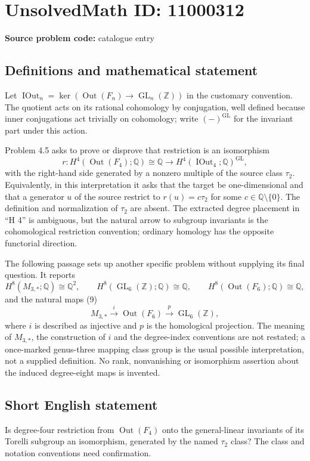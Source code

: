 \documentclass[11pt]{article}
\newcommand{\Z}{\mathbb{Z}}
\newcommand{\Q}{\mathbb{Q}}
\begin{document}
\section*{UnsolvedMath ID: 11000312}
\textbf{Source problem code:} catalogue entry
\subsection{Definitions and mathematical statement}
Let $\operatorname{IOut}_n=\ker(\operatorname{Out}(F_n)\to\operatorname{GL}_n(\Z))$ in the customary convention. The quotient acts on its rational cohomology by conjugation, well defined because inner conjugations act trivially on cohomology; write $(-)^{\operatorname{GL}}$ for the invariant part under this action.

Problem 4.5 asks to prove or disprove that restriction is an isomorphism
\[
 r:H^4(\operatorname{Out}(F_4);\Q)\cong\Q
 \longrightarrow
 H^4(\operatorname{IOut}_4;\Q)^{\operatorname{GL}},
\]
with the right-hand side generated by a nonzero multiple of the source class $\tau_2$. Equivalently, in this interpretation it asks that the target be one-dimensional and that a generator $u$ of the source restrict to $r(u)=c\tau_2$ for some $c\in\Q\setminus\{0\}$. The definition and normalization of $\tau_2$ are absent. The extracted degree placement in ``H 4'' is ambiguous, but the natural arrow to subgroup invariants is the cohomological restriction convention; ordinary homology has the opposite functorial direction.

The following passage sets up another specific problem without supplying its final question. It reports
\[
 H^8(M_{3,*};\Q)\cong\Q^2,\qquad
 H^8(\operatorname{GL}_6(\Z);\Q)\cong\Q,\qquad
 H^8(\operatorname{Out}(F_6);\Q)\cong\Q,
\]
and the natural maps (9)
\[
 M_{3,*}\xrightarrow{\ i\ }\operatorname{Out}(F_6)
 \xrightarrow{\ p\ }\operatorname{GL}_6(\Z),
\]
where $i$ is described as injective and $p$ is the homological projection. The meaning of $M_{3,*}$, the construction of $i$ and the degree-index conventions are not restated; a once-marked genus-three mapping class group is the usual possible interpretation, not a supplied definition. No rank, nonvanishing or isomorphism assertion about the induced degree-eight maps is invented.
\subsection{Short English statement}
Is degree-four restriction from $\operatorname{Out}(F_4)$ onto the general-linear invariants of its Torelli subgroup an isomorphism, generated by the named $\tau_2$ class? The class and notation conventions need confirmation.
\end{document}
